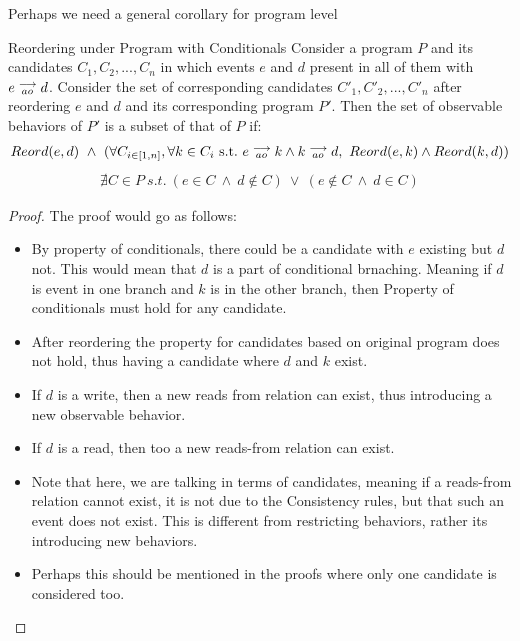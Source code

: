     Perhaps we need a general corollary for program level 
    \begin{corollary}{Reordering under Program with Conditionals}
        Consider a program $P$ and its candidates $C_1, C_2, ... , C_n$ in which events $e$ and $d$ present in all of them with $e\stackrel{\longrightarrow}{_{ao}}d$. Consider the set of corresponding candidates $C'_1, C'_2, ... , C'_n$ after reordering $e$ and $d$ and its corresponding program $P'$. Then the set of observable behaviors of $P'$ is a subset of that of $P$ if:
        \begin{align*}
            Reord(e,d) \ \wedge \ 
            ( \forall C_{i \in [1,n]}, \forall k \in C_i \ \text{s.t.} \ \reln{e}{ao}{k} \wedge \reln{k}{ao}{d}, \    
            Reord(e,k) \wedge Reord(k,d) )
        \end{align*}
        \begin{align*}
            \nexists C \in P \ s.t. \ 
                (e \in C \ \wedge \ d \notin C) \ \vee \ 
                (e \notin C \ \wedge \ d \in C) 
        \end{align*}
    \end{corollary}

    \begin{proof}
        The proof would go as follows:
        \begin{itemize}
            \item By property of conditionals, there could be a candidate with $e$ existing but $d$ not. This would mean that $d$ is a part of conditional brnaching. Meaning if $d$ is event in one branch and $k$ is in the other branch, then Property of conditionals must hold for any candidate. 
            \item After reordering the property for candidates based on original program does not hold, thus having a candidate where $d$ and $k$ exist. 
            \item If $d$ is a write, then a new reads from relation can exist, thus introducing a new observable behavior.
            \item If $d$ is a read, then too a new reads-from relation can exist. 
            \item Note that here, we are talking in terms of candidates, meaning if a reads-from relation cannot exist, it is not due to the Consistency rules, but that such an event does not exist. This is different from restricting behaviors, rather its introducing new behaviors. 
            \item Perhaps this should be mentioned in the proofs where only one candidate is considered too.  
        \end{itemize}
    \end{proof}

